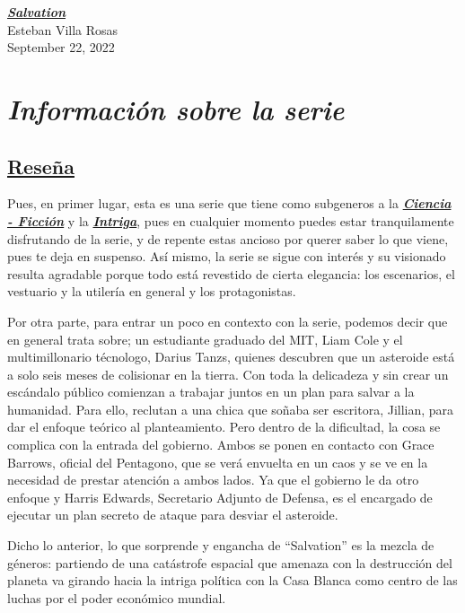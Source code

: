 \documentclass[a5paper,11pt]{article}
\begin{document}
\begin{center}

{\Huge{{\textbf{\emph{\underline{Salvation}}}}}}\\

{\small{Esteban Villa Rosas }}\\

{\small{September 22, 2022}}

\end{center}

\section{\Large{\emph{Información sobre la serie}}}
    \subsection{\large{\underline{Reseña}}} \small{Pues, en primer lugar, esta es una serie que tiene como subgeneros a la {\textbf{\emph{\underline{Ciencia - Ficción}}}} y la  {\textbf{\emph{\underline{Intriga}}}}, pues en cualquier momento puedes estar tranquilamente disfrutando de la serie, y de repente estas ancioso por querer saber lo que viene, pues te deja en suspenso. Así mismo, la serie se sigue con interés y su visionado resulta agradable porque todo está revestido de cierta elegancia: los escenarios, el vestuario y la utilería en general y los protagonistas. 
    
    Por otra parte, para entrar un poco en contexto con la serie, podemos decir que en general trata sobre; un estudiante graduado del MIT, Liam Cole y el multimillonario técnologo, Darius Tanzs, quienes descubren que un asteroide está a solo seis meses de colisionar en la tierra. Con toda la delicadeza y sin crear un escándalo público comienzan a trabajar juntos en un plan para salvar a la humanidad. Para ello, reclutan a una chica que soñaba ser escritora, Jillian, para dar el enfoque teórico al planteamiento. Pero dentro de la dificultad, la cosa se complica con la entrada del gobierno. Ambos se ponen en contacto con Grace Barrows, oficial del Pentagono, que se verá envuelta en un caos y se ve en la necesidad de prestar atención a ambos lados. Ya que el gobierno le da otro enfoque y Harris Edwards, Secretario Adjunto de Defensa, es el encargado de ejecutar un plan secreto de ataque para desviar el asteroide.
    
    Dicho lo anterior, lo que sorprende y engancha de ``Salvation'' es la mezcla de géneros: partiendo de una catástrofe espacial que amenaza con la destrucción del planeta va girando hacia la intriga política con la Casa Blanca como centro de las luchas por el poder económico mundial.
    
}
\end{document}
